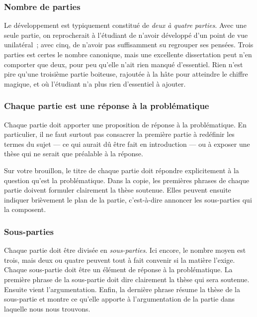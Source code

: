 \documentclass[a4paper]{article}
\begin{document}
\subsubsection{Nombre de parties}
\label{sec-3-1-1}

Le développement est typiquement constitué de \emph{deux à quatre parties}.
Avec une seule partie, on reprocherait à l'étudiant de n'avoir développé
d'un point de vue unilatéral ; avec cinq, de n'avoir pas suffisamment su
regrouper ses pensées. Trois parties est certes le nombre canonique,
mais une excellente dissertation peut n'en comporter que deux, pour peu
qu'elle n'ait rien manqué d'essentiel. Rien n'est pire qu'une troisième
partie boiteuse, rajoutée à la hâte pour atteindre le chiffre magique,
et où l'étudiant n'a plus rien d'essentiel à ajouter.

\subsubsection{Chaque partie est une réponse à la problématique}
\label{sec-3-1-2}

Chaque partie doit apporter une proposition de réponse à la
problématique. En particulier, il ne faut surtout pas consacrer la
première partie à redéfinir les termes du sujet --- ce qui aurait dû
être fait en introduction --- ou à exposer une thèse qui ne serait que
préalable à la réponse.

Sur votre brouillon, le titre de chaque partie doit répondre
explicitement à la question qu'est la problématique. Dans la copie, les
premières phrases de chaque partie doivent formuler clairement la thèse
soutenue. Elles peuvent ensuite indiquer brièvement le plan de la
partie, c'est-à-dire annoncer les sous-parties qui la composent.

\subsubsection{Sous-parties}
\label{sec-3-1-3}

Chaque partie doit être divisée en \emph{sous-parties}. Ici encore, le nombre
moyen est trois, mais deux ou quatre peuvent tout à fait convenir si la
matière l'exige. Chaque sous-partie doit être un élément de réponse à la
problématique. La première phrase de la sous-partie doit dire clairement
la thèse qui sera soutenue. Ensuite vient l'argumentation. Enfin, la
dernière phrase résume la thèse de la sous-partie et montre ce qu'elle
apporte à l'argumentation de la partie dans laquelle nous nous trouvons.
\end{document}
